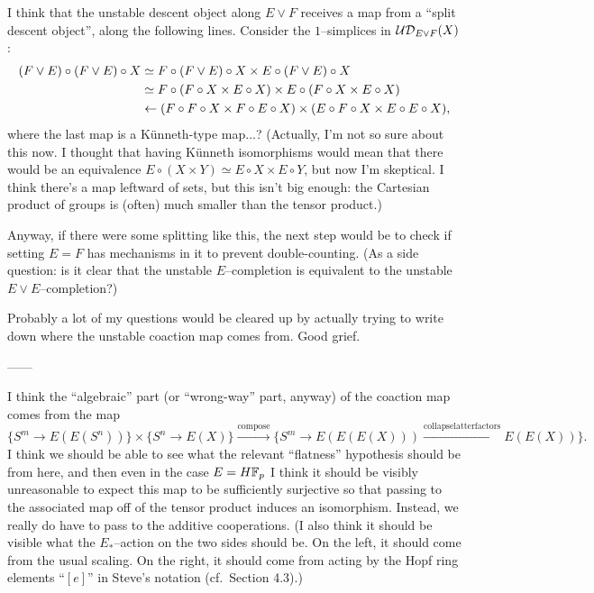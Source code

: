 I think that the unstable descent object along $E \vee F$ receives a map from a ``split descent object'', along the following lines.  Consider the $1$--simplices in $\mathcal{UD}_{E \vee F}(X)$:
\begin{align*}
(F \vee E) \circ (F \vee E) \circ X & \simeq F \circ (F \vee E) \circ X \times E \circ (F \vee E) \circ X \\
& \simeq F \circ (F \circ X \times E \circ X) \times E \circ (F \circ X \times E \circ X) \\
& \leftarrow (F \circ F \circ X \times F \circ E \circ X) \times (E \circ F \circ X \times E \circ E \circ X),
\end{align*}
where the last map is a K\"unneth-type map...?  (Actually, I'm not so sure about this now. I thought that having K\"unneth isomorphisms would mean that there would be an equivalence $E \circ (X \times Y) \simeq E \circ X \times E \circ Y$, but now I'm skeptical.  I think there's a map leftward of sets, but this isn't big enough: the Cartesian product of groups is (often) much smaller than the tensor product.)

Anyway, if there were some splitting like this, the next step would be to check if setting $E = F$ has mechanisms in it to prevent double-counting.  (As a side question: is it clear that the unstable $E$--completion is equivalent to the unstable $E \vee E$--completion?)

Probably a lot of my questions would be cleared up by actually trying to write down where the unstable coaction map comes from.  Good grief.

------

I think the ``algebraic'' part (or ``wrong-way'' part, anyway) of the coaction map comes from the map \[\{S^m \to E(E(S^n))\} \times \{S^n \to E(X)\} \xrightarrow{\mathrm{compose}} \{S^m \to E(E(E(X))) \xrightarrow{\mathrm{collapse latter factors}} E(E(X))\}.\]  I think we should be able to see what the relevant ``flatness'' hypothesis should be from here, and then even in the case $E = H\mathbb F_p$ I think it should be visibly unreasonable to expect this map to be sufficiently surjective so that passing to the associated map off of the tensor product induces an isomorphism.  Instead, we really do have to pass to the additive cooperations.  (I also think it should be visible what the $E_*$--action on the two sides should be.  On the left, it should come from the usual scaling.  On the right, it should come from acting by the Hopf ring elements ``$[e]$'' in Steve's notation (cf.\ Section 4.3).)





